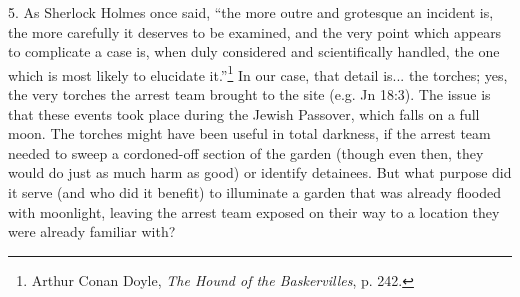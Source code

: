 5. As Sherlock Holmes once said, ``the more outre and grotesque an incident is, the more carefully it deserves to be examined, and the very point which appears to complicate a case is, when duly considered and scientifically handled, the one which is most likely to elucidate it.''\footnote{Arthur Conan Doyle, \emph{The Hound of the Baskervilles}, p. 242.} In our case, that detail is... the torches; yes, the very torches the arrest team brought to the site (e.g. Jn 18:3). The issue is that these events took place during the Jewish Passover, which falls on a full moon. The torches might have been useful in total darkness, if the arrest team needed to sweep a cordoned-off section of the garden (though even then, they would do just as much harm as good) or identify detainees. But what purpose did it serve (and who did it benefit) to illuminate a garden that was already flooded with moonlight, leaving the arrest team exposed on their way to a location they were already familiar with?